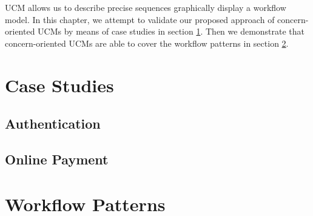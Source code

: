 UCM allows us to describe precise sequences  graphically display a workflow model. In this chapter, we attempt to validate our proposed approach of concern-oriented UCMs by means of case studies in section \ref{sec:5.1}. Then we demonstrate that concern-oriented UCMs are able to cover the workflow patterns in section \ref{sec:5.2}.

\section{Case Studies} \label{sec:5.1}

\subsection{Authentication}

\subsection{Online Payment}

\section{Workflow Patterns} \label{sec:5.2}
